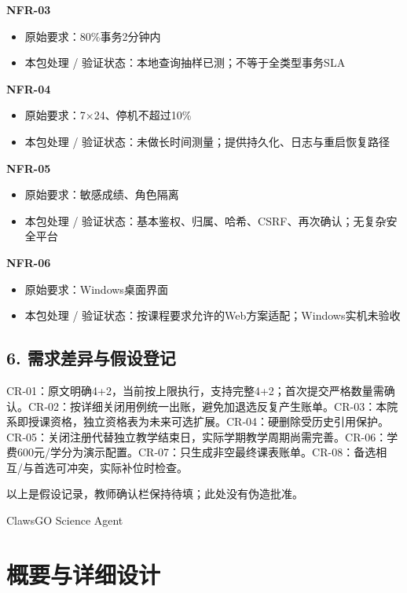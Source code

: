 \documentclass[UTF8,11pt,a4paper]{ctexart}
\providecommand{\tightlist}{\setlength{\itemsep}{0pt}\setlength{\parskip}{0pt}}
\begin{document}
\textbf{NFR-03}

\begin{itemize}
\tightlist
\item
  原始要求：80\%事务2分钟内
\item
  本包处理 / 验证状态：本地查询抽样已测；不等于全类型事务SLA
\end{itemize}

\textbf{NFR-04}

\begin{itemize}
\tightlist
\item
  原始要求：7×24、停机不超过10\%
\item
  本包处理 / 验证状态：未做长时间测量；提供持久化、日志与重启恢复路径
\end{itemize}

\textbf{NFR-05}

\begin{itemize}
\tightlist
\item
  原始要求：敏感成绩、角色隔离
\item
  本包处理 /
  验证状态：基本鉴权、归属、哈希、CSRF、再次确认；无复杂安全平台
\end{itemize}

\textbf{NFR-06}

\begin{itemize}
\tightlist
\item
  原始要求：Windows桌面界面
\item
  本包处理 / 验证状态：按课程要求允许的Web方案适配；Windows实机未验收
\end{itemize}

\hypertarget{6-ux9700ux6c42ux5deeux5f02ux4e0eux5047ux8bbeux767bux8bb0}{%
\subsection{6.
需求差异与假设登记}\label{6-ux9700ux6c42ux5deeux5f02ux4e0eux5047ux8bbeux767bux8bb0}}

CR-01：原文明确4+2，当前按上限执行，支持完整4+2；首次提交严格数量需确认。CR-02：按详细关闭用例统一出账，避免加退选反复产生账单。CR-03：本院系即授课资格，独立资格表为未来可选扩展。CR-04：硬删除受历史引用保护。CR-05：关闭注册代替独立教学结束日，实际学期教学周期尚需完善。CR-06：学费600元/学分为演示配置。CR-07：只生成非空最终课表账单。CR-08：备选相互/与首选可冲突，实际补位时检查。

以上是假设记录，教师确认栏保持待填；此处没有伪造批准。

ClawsGO Science Agent

\clearpage
\hypertarget{ux6982ux8981ux4e0eux8be6ux7ec6ux8bbeux8ba1}{%
\section{概要与详细设计}\label{ux6982ux8981ux4e0eux8be6ux7ec6ux8bbeux8ba1}}
\end{document}
